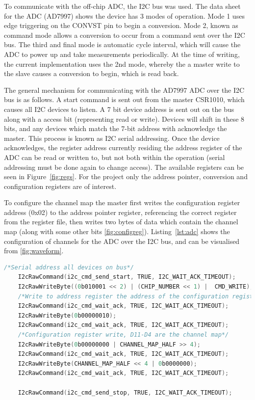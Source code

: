 \documentclass[]{article}
\begin{document}
To communicate with the off-chip \ac{ADC}, the I2C bus was used. The data sheet for the \ac{ADC} (AD7997) \cite{ad7997} shows the device has 3 modes of operation. Mode 1 uses edge triggering on the CONVST pin to begin a conversion. Mode 2, known as command mode allows a conversion to occur from a command sent over the I2C bus. The third and final mode is automatic cycle interval, which will cause the \ac{ADC} to power up and take measurements periodically. At the time of writing, the current implementation uses the 2nd mode, whereby the a master write to the slave causes a conversion to begin, which is read back. 

The general mechanism for communicating with the AD7997 \ac{ADC} over the I2C bus is as follows. A start command is sent out from the master CSR1010, which causes all I2C devices to listen. A 7 bit device address is sent out on the bus along with a access bit (representing read or write). Devices will shift in these 8 bits, and any devices which match the 7-bit address with acknowledge the master. This process is known as I2C serial addressing. Once the device acknowledges, the register address currently residing the address register of the \ac{ADC} can be read or written to, but not both within the operation (serial addressing must be done again to change access). The available registers can be seen in Figure~\ref{fig:regs}. For the project only the address pointer, conversion and configuration registers are of interest. 

To configure the channel map the master first writes the configuration register address (0x02) to the address pointer register, referencing the correct register from the register file, then writes two bytes of data which contain the channel map (along with some other bits \ref{fig:configreg}). Listing~\ref{lst:adc} shows the configuration of channels for the \ac{ADC} over the I2C bus, and can be visualised from \ref{fig:waveform}.


\begin{lstlisting}[language=C, caption=ADC I2C bus channel map configuration,label={lst:adc}]
    /*Serial address all devices on bus*/
    I2cRawCommand(i2c_cmd_send_start, TRUE, I2C_WAIT_ACK_TIMEOUT);
    I2cRawWriteByte((0b010001 << 2) | (CHIP_NUMBER << 1) |  CMD_WRITE);
    /*Write to address register the address of the configuration register */
    I2cRawCommand(i2c_cmd_wait_ack, TRUE, I2C_WAIT_ACK_TIMEOUT);
    I2cRawWriteByte(0b00000010);
    I2cRawCommand(i2c_cmd_wait_ack, TRUE, I2C_WAIT_ACK_TIMEOUT);  
    /*Configuration register write, D11-D4 are the channel map*/
    I2cRawWriteByte(0b00000000 | CHANNEL_MAP_HALF >> 4);
    I2cRawCommand(i2c_cmd_wait_ack, TRUE, I2C_WAIT_ACK_TIMEOUT);  
    I2cRawWriteByte(CHANNEL_MAP_HALF << 4 | 0b0000000);
    I2cRawCommand(i2c_cmd_wait_ack, TRUE, I2C_WAIT_ACK_TIMEOUT);  
    
    I2cRawCommand(i2c_cmd_send_stop, TRUE, I2C_WAIT_ACK_TIMEOUT);
\end{lstlisting}
\end{document}
